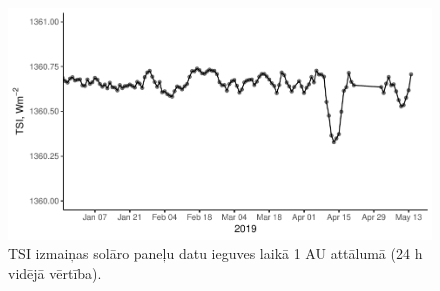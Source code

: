 \begin{figure}[h]
    \centering
    \includegraphics[width=\linewidth]{figures/misc/TSI.pdf}
    \caption{TSI izmaiņas solāro paneļu datu ieguves laikā 1 AU attālumā (24 h vidējā vērtība)\cite{TSIdata}.}
    \label{fig:TSI2}
\end{figure}
